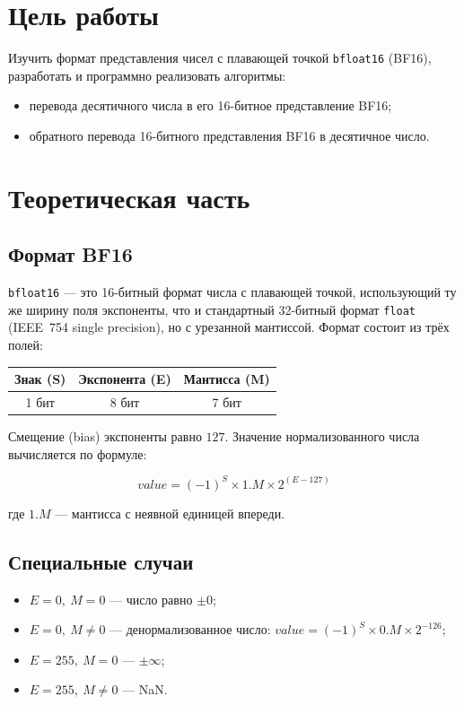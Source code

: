 \documentclass[12pt,a4paper]{article}
\begin{document}
\section{Цель работы}

Изучить формат представления чисел с плавающей точкой \texttt{bfloat16} (BF16),
разработать и программно реализовать алгоритмы:
\begin{itemize}
    \item перевода десятичного числа в его 16-битное представление BF16;
    \item обратного перевода 16-битного представления BF16 в десятичное число.
\end{itemize}

\section{Теоретическая часть}

\subsection{Формат BF16}

\texttt{bfloat16} — это 16-битный формат числа с плавающей точкой,
использующий ту же ширину поля экспоненты, что и стандартный 32-битный
формат \texttt{float} (IEEE~754 single precision), но с урезанной мантиссой.
Формат состоит из трёх полей:

\begin{center}
\begin{tabular}{|c|c|c|}
\hline
Знак (S) & Экспонента (E) & Мантисса (M) \\
\hline
1 бит & 8 бит & 7 бит \\
\hline
\end{tabular}
\end{center}

Смещение (bias) экспоненты равно $127$. Значение нормализованного числа
вычисляется по формуле:

\begin{equation}
value = (-1)^S \times 1.M \times 2^{(E - 127)}
\end{equation}

где $1.M$ — мантисса с неявной единицей впереди.

\subsection{Специальные случаи}

\begin{itemize}
    \item $E = 0,\ M = 0$ — число равно $\pm 0$;
    \item $E = 0,\ M \neq 0$ — денормализованное число: $value = (-1)^S \times 0.M \times 2^{-126}$;
    \item $E = 255,\ M = 0$ — $\pm\infty$;
    \item $E = 255,\ M \neq 0$ — NaN.
\end{itemize}
\end{document}
